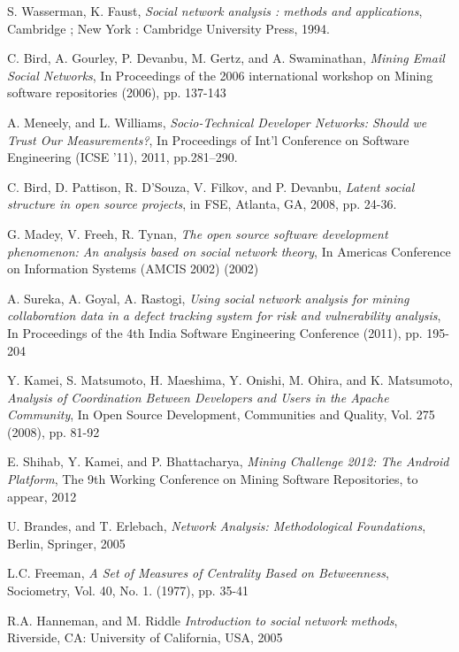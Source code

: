 \documentclass[conference]{IEEEtran}
\begin{document}
\begin{thebibliography}{2}

S. Wasserman, K. Faust, \emph{Social network analysis : methods and applications}, Cambridge ; New York : Cambridge University Press, 1994.

C. Bird, A. Gourley, P. Devanbu, M. Gertz, and A. Swaminathan, \emph{Mining Email Social Networks}, In Proceedings of the 2006 international workshop on Mining software repositories (2006), pp. 137-143

A. Meneely, and L. Williams, \emph{Socio-Technical Developer Networks: Should we Trust Our Measurements?}, In Proceedings of Int’l Conference on Software Engineering (ICSE ’11), 2011, pp.281–290.

  
C. Bird, D. Pattison, R. D'Souza, V. Filkov, and P. Devanbu, \emph{Latent social structure in open source projects}, in FSE, Atlanta, GA, 2008, pp. 24-36.

G. Madey, V. Freeh, R. Tynan, \emph{The open source software development phenomenon: An analysis based on social network theory}, In Americas Conference on Information Systems (AMCIS 2002) (2002)

A. Sureka, A. Goyal, A. Rastogi, \emph{Using social network analysis for mining collaboration data in a defect tracking system for risk and vulnerability analysis}, In Proceedings of the 4th India Software Engineering Conference (2011), pp. 195-204

Y. Kamei, S. Matsumoto, H. Maeshima, Y. Onishi, M. Ohira, and K. Matsumoto, \emph{Analysis of Coordination Between Developers and Users in the Apache Community}, In Open Source Development, Communities and Quality, Vol. 275 (2008), pp. 81-92

E. Shihab, Y. Kamei, and P. Bhattacharya, \emph{Mining Challenge 2012: The Android Platform}, The 9th Working Conference on Mining Software Repositories, to appear, 2012

U. Brandes, and T. Erlebach, \emph{Network Analysis: Methodological Foundations}, Berlin, Springer, 2005

L.C. Freeman, \emph{A Set of Measures of Centrality Based on Betweenness}, Sociometry, Vol. 40, No. 1. (1977), pp. 35-41

R.A. Hanneman, and M. Riddle \emph{Introduction to social network methods}, Riverside, CA:  University of California, USA, 2005


\end{thebibliography}
\end{document}
